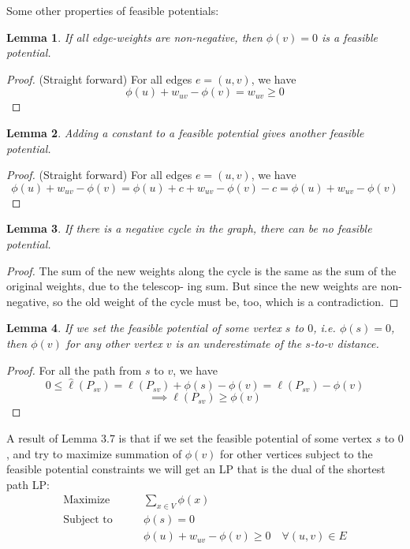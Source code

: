 \documentclass[11pt]{article}
\theoremstyle{plain}
\newtheorem{lemma}{Lemma}[section]
\begin{document}
  Some other properties of feasible potentials:
  \begin{lemma}
    If all edge-weights are non-negative, then $\phi(v) = 0$ is a feasible potential.
  \end{lemma}
  \begin{proof}
    (Straight forward) For all edges $e = (u, v)$, we have 
    \[
      \phi(u) + w_{uv} - \phi(v) = w_{uv} \geq 0
    \]
  \end{proof}

  \begin{lemma}
    Adding a constant to a feasible potential gives another feasible potential.
  \end{lemma}
  \begin{proof}
    (Straight forward) For all edges $e = (u, v)$, we have 
    \[
      \phi(u) + w_{uv} - \phi(v) = \phi(u) + c + w_{uv} - \phi(v) - c = \phi(u) + w_{uv} - \phi(v)
    \]
  \end{proof}

  \begin{lemma}
    If there is a negative cycle in the graph, there can be no feasible potential.
  \end{lemma}
  \begin{proof}
    The sum of the new weights along the cycle is
    the same as the sum of the original weights, due to the telescop-
    ing sum. But since the new weights are non-negative, so the old
    weight of the cycle must be, too, which is a contradiction.
  \end{proof}

  \begin{lemma}
    If we set the feasible potential of some vertex $s$ to $0$, i.e. $\phi(s) = 0$, then 
    $\phi(v)$ for any other vertex $v$ is an underestimate of the $s$-to-$v$ distance.
  \end{lemma}
  \begin{proof}
  For all the path from $s$ to $v$, we have
  \[
    0 \leq \hat \ell(P_{sv}) = \ell(P_{sv}) + \phi(s) - \phi(v) = \ell(P_{sv}) - \phi(v)
  \]
  \[
    \implies \ell(P_{sv}) \geq \phi(v)
  \]
  \end{proof}

  A result of Lemma 3.7 is that if we set the feasible potential of some vertex $s$ to $0$, 
  and try to maximize summation of $\phi(v)$ for other vertices subject to the feasible 
  potential constraints we will get an LP that is the dual of the shortest path LP:\@
  \begin{align*}
    \text{Maximize}\qquad &\sum_{x\in V} \phi(x) \\
    \text{Subject to}\qquad &\phi(s) = 0 \\
    &\phi(u) + w_{uv} - \phi(v) \geq 0 \quad \forall (u, v) \in E
  \end{align*}
\end{document}
